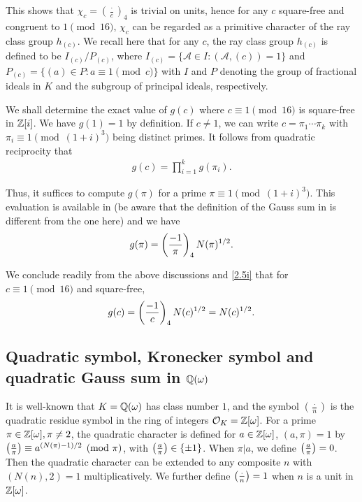 \documentclass[twoside,leqno,10pt, A4]{amsart}
\begin{document}
   This shows that $\chi_c =(\frac {\cdot}{c})_4$ is trivial on
units, hence for any $c$ square-free and congruent to $1 \pmod {16}$, $\chi_c$ can be regarded as a primitive character of the ray
class group $h_{(c)}$. We recall here that for any $c$, the ray
class group $h_{(c)}$ is defined to be $I_{(c)}/P_{(c)}$, where
$I_{(c)} = \{ \mathcal{A} \in I : (\mathcal{A}, (c)) = 1 \}$ and
$P_{(c)} = \{(a) \in P : a \equiv 1 \pmod{c} \}$ with $I$ and $P$
denoting the group of fractional ideals in $K$ and the subgroup of
principal ideals, respectively. \newline


We shall determine the exact value of $g(c)$ where $c \equiv 1 \pmod {16}$ is square-free in $\mathbb Z[i]$. We have $g(1)=1$ by definition. If $c \neq 1$, we can write $c=\pi_1\cdots \pi_k$ with $\pi_i \equiv 1 \pmod {(1+i)^3}$ being distinct primes. It follows from quadratic reciprocity that
\begin{align*}
  g(c)=  \prod^k_{i=1}g(\pi_i).
\end{align*}

   Thus, it suffices to compute $g(\pi)$ for a prime $\pi \equiv 1 \pmod {(1+i)^3}$. This evaluation is available in \cite[Proposition 2.2]{Onodera} (be aware that the definition of the Gauss sum in \cite{Onodera} is different from the one here) and we have
\[   g(\pi)=\left(\frac{-1}{\pi}\right)_4N(\pi)^{1/2}. \]

We conclude readily from the above discussions and \eqref{2.5i} that for $c \equiv 1 \pmod {16}$ and square-free,
\begin{equation} \label{gcvalueQi}
   g(c)=\left(\frac{-1}{c}\right)_4N(c)^{1/2}=N(c)^{1/2}.
\end{equation}

\subsection{Quadratic symbol, Kronecker symbol and quadratic Gauss sum in $\mathbb Q(\omega)$}
   It is well-known that $K=\mathbb Q(\omega)$ has class number $1$, and the symbol $(\frac{\cdot}{n})$ is the quadratic
residue symbol in the ring of integers $\mathcal{O}_K =\mathbb Z[\omega]$.  For a prime $\pi \in \mathbb Z[\omega], \pi \neq 2$, the quadratic character is defined for $a \in
\mathbb Z[\omega]$, $(a, \pi)=1$ by $\left(\frac{a}{\pi}\right) \equiv
a^{(N(\pi)-1)/2} \pmod{\pi}$, with $\left(\frac{a}{\pi}\right) \in \{
\pm 1 \}$. When $\pi | a$, we define
$\left(\frac{a}{\pi}\right) =0$.  Then the quadratic character can be extended
to any composite $n$ with $(N(n), 2)=1$ multiplicatively. We further define $\left(\frac{\cdot}{n}\right)=1$ when $n$ is a unit in $\mathbb Z[\omega]$. \newline
\end{document}

